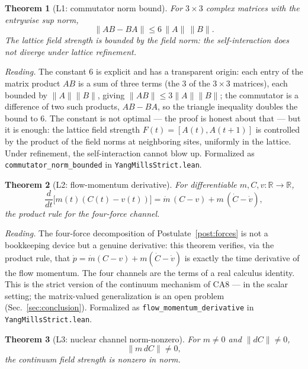 \documentclass[aps,prd,preprint,superscriptaddress,amsmath,amssymb]{revtex4-2}
\newtheorem{theorem}{Theorem}[section]
\begin{document}
\begin{theorem}[L1: commutator norm bound]
\label{thm:l1}
For $3\times3$ complex matrices with the entrywise sup norm,
\begin{equation}
\|AB-BA\| \le 6\,\|A\|\,\|B\| .
\end{equation}
The lattice field strength is bounded by the field norm: the
self-interaction does not diverge under lattice refinement.
\end{theorem}

\emph{Reading.}  The constant $6$ is explicit and has a transparent
origin: each entry of the matrix product $AB$ is a sum of three
terms (the $3$ of the $3\times3$ matrices), each bounded by
$\|A\|\|B\|$, giving $\|AB\|\le 3\|A\|\|B\|$; the commutator is a
difference of two such products, $AB-BA$, so the triangle inequality
doubles the bound to $6$.  The constant is not optimal --- the proof
is honest about that --- but it is enough: the lattice field
strength $F(t)=[A(t),A(t{+}1)]$ is controlled by the product of the
field norms at neighboring sites, uniformly in the lattice.  Under
refinement, the self-interaction cannot blow up.  Formalized as
\texttt{commutator\_norm\_bounded} in \texttt{YangMillsStrict.lean}.

\begin{theorem}[L2: flow-momentum derivative]
\label{thm:l2}
For differentiable $m,C,v:\mathbb{R}\to\mathbb{R}$,
\begin{equation}
\frac{d}{dt}\bigl[m(t)(C(t)-v(t))\bigr]
= \dot m\,(C-v) + m\,(\dot C-\dot v),
\end{equation}
the product rule for the four-force channel.
\end{theorem}

\emph{Reading.}  The four-force decomposition of
Postulate~\ref{post:forces} is not a bookkeeping device but a genuine
derivative: this theorem verifies, via the product rule, that
$\dot p=\dot m(C-v)+m(\dot C-\dot v)$ is exactly the time derivative
of the flow momentum.  The four channels are the terms of a real
calculus identity.  This is the strict version of the continuum
mechanism of CA8 --- in the scalar setting; the matrix-valued
generalization is an open problem (Sec.~\ref{sec:conclusion}).  Formalized as
\texttt{flow\_momentum\_derivative} in \texttt{YangMillsStrict.lean}.

\begin{theorem}[L3: nuclear channel norm-nonzero]
\label{thm:l3}
For $m\neq0$ and $\|dC\|\neq0$,
\begin{equation}
\|m\,dC\|\neq0,
\end{equation}
the continuum field strength is nonzero in norm.
\end{theorem}
\end{document}

